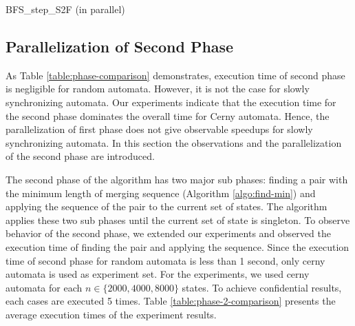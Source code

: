 \documentclass[12pt]{article}
\begin{document}
\begin{algorithm}[ht]
	\label{algo:BFS-step-S2F-Parallel}
	\caption{BFS\_step\_S2F (in parallel)}
	
	
		{
		}
\end{algorithm}


\subsection{Parallelization of Second Phase}
\label{sec:second-phase-parallelization}

As Table \ref{table:phase-comparison} demonstrates, execution time of second phase is negligible for random automata. However, it is not the case for slowly synchronizing automata. Our experiments indicate that the execution time for the second phase dominates the overall time for Cerny automata. Hence, the parallelization of first phase does not give observable speedups for slowly synchronizing automata. In this section the observations and the parallelization of the second phase are introduced.

The second phase of the algorithm has two major sub phases: finding a pair with the minimum length of merging sequence (Algorithm \ref{algo:find-min}) and applying the sequence of the pair to the current set of states. The algorithm applies these two sub phases until the current set of state is singleton. To observe behavior of the second phase, we extended our experiments and observed the execution time of finding the pair and applying the sequence. Since the execution time of second phase for random automata is less than 1 second, only cerny automata is used as experiment set. For the experiments, we used cerny automata for each $n \in \{2000, 4000, 8000\}$ states. To achieve confidential results, each cases are executed 5 times. Table \ref{table:phase-2-comparison} presents the average execution times of the experiment results.
\end{document}
